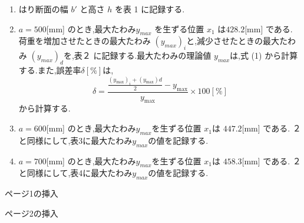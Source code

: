 \documentclass[a4paper,11pt]{jsarticle}
\begin{document}
\begin{enumerate}
  \item はり断面の幅 $b'$ と高さ $h$ を表 1 に記録する.
  \item $a = 500 $[mm] のとき,最大たわみ$y_{max}$ を生ずる位置 $x_1$ は$ 428.2 $[mm] である.
        荷重を増加させたときの最大たわみ $(y_{max})_i$と,減少させたときの最大たわみ $(y_{max})_d$を,表２
        に記録する.最大たわみの理論値 $y_{max}$は,式 (1) から計算する.また,誤差率$ \delta [\%]$は,
        \begin{equation}
          \delta = \frac{{\frac{{(y_{\text{max}})_i + (y_{\text{max}})d}}{2} - y_{\text{max}}}}{{y_{\text{max}}}} \times 100[\%]
        \end{equation}
        から計算する.
  \item $a = 600 $[mm] のとき,最大たわみ$ y_{max}$を生ずる位置 $x_1$は $447.2 $[mm] である.
        ２と同様にして,表3に最大たわみ$y_{max}$の値を記録する.
  \item $a = 700 $[mm] のとき,最大たわみ$ y_{max}$を生ずる位置 $x_1$は $458.3 $[mm] である.
        ２と同様にして,表4に最大たわみ$y_{max}$の値を記録する.
\end{enumerate}

\clearpage
ページ1の挿入

\clearpage

ページ2の挿入
\clearpage
\end{document}
